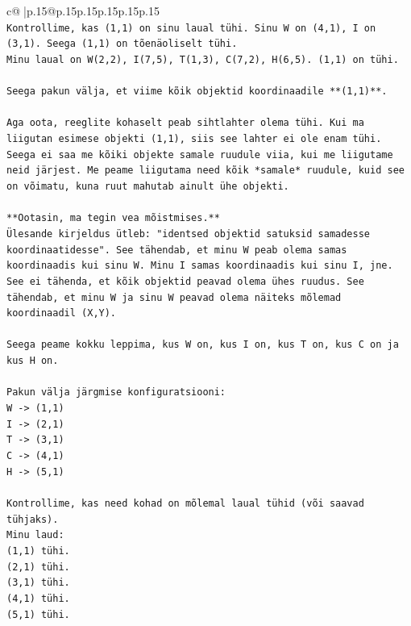 \documentclass{article}
\begin{document}
{\begin{supertabular}{c@{$\;$}|p{.15\linewidth}@{}p{.15\linewidth}p{.15\linewidth}p{.15\linewidth}p{.15\linewidth}p{.15\linewidth}}
{{{\\ 
\texttt{Kontrollime, kas (1,1) on sinu laual tühi. Sinu W on (4,1), I on (3,1). Seega (1,1) on tõenäoliselt tühi.} \\
\texttt{Minu laual on W(2,2), I(7,5), T(1,3), C(7,2), H(6,5). (1,1) on tühi.} \\
\\ 
\texttt{Seega pakun välja, et viime kõik objektid koordinaadile **(1,1)**.} \\
\\ 
\texttt{Aga oota, reeglite kohaselt peab sihtlahter olema tühi. Kui ma liigutan esimese objekti (1,1), siis see lahter ei ole enam tühi. Seega ei saa me kõiki objekte samale ruudule viia, kui me liigutame neid järjest. Me peame liigutama need kõik *samale* ruudule, kuid see on võimatu, kuna ruut mahutab ainult ühe objekti.} \\
\\ 
\texttt{**Ootasin, ma tegin vea mõistmises.**} \\
\texttt{Ülesande kirjeldus ütleb: "identsed objektid satuksid samadesse koordinaatidesse". See tähendab, et minu W peab olema samas koordinaadis kui sinu W. Minu I samas koordinaadis kui sinu I, jne. See ei tähenda, et kõik objektid peavad olema ühes ruudus. See tähendab, et minu W ja sinu W peavad olema näiteks mõlemad koordinaadil (X,Y).} \\
\\ 
\texttt{Seega peame kokku leppima, kus W on, kus I on, kus T on, kus C on ja kus H on.} \\
\\ 
\texttt{Pakun välja järgmise konfiguratsiooni:} \\
\texttt{W {-}> (1,1)} \\
\texttt{I {-}> (2,1)} \\
\texttt{T {-}> (3,1)} \\
\texttt{C {-}> (4,1)} \\
\texttt{H {-}> (5,1)} \\
\\ 
\texttt{Kontrollime, kas need kohad on mõlemal laual tühid (või saavad tühjaks).} \\
\texttt{Minu laud:} \\
\texttt{(1,1) tühi.} \\
\texttt{(2,1) tühi.} \\
\texttt{(3,1) tühi.} \\
\texttt{(4,1) tühi.} \\
\texttt{(5,1) tühi.} \\
}}}
\end{supertabular}}
\end{document}
